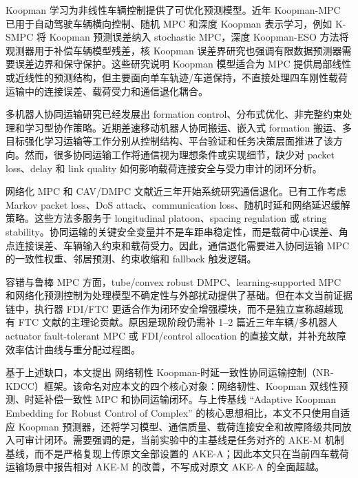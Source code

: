 \documentclass[twocolumn,3p,times,procedia]{elsarticle}
\newcommand{\AKE}{AKE-M}
\newcommand{\Method}{NR-KDCC}
\newcommand{\MethodCN}{网络韧性 Koopman-时延一致性协同运输控制}
\begin{document}
Koopman 学习为非线性车辆控制提供了可优化预测模型。近年 Koopman-MPC 已用于自动驾驶车辆横向控制、随机 MPC 和深度 Koopman 表示学习，例如 K-SMPC 将 Koopman 预测误差纳入 stochastic MPC，深度 Koopman-ESO 方法将观测器用于补偿车辆模型残差，核 Koopman 误差界研究也强调有限数据预测器需要误差边界和保守保护\cite{kim2025ksmpc,chen2024esoDeepKoopman,philipp2023koopmanErrorBounds,cibulka2021koopmanVehicleMpc}。这些研究说明 Koopman 模型适合为 MPC 提供局部线性或近线性的预测结构，但主要面向单车轨迹/车道保持，不直接处理四车刚性载荷运输中的连接误差、载荷受力和通信退化耦合。

多机器人协同运输研究已经发展出 formation control、分布式优化、非完整约束处理和学习型协作策略。近期差速移动机器人协同搬运、嵌入式 formation 搬运、多目标强化学习运输等工作分别从控制结构、平台验证和任务决策层面推进了该方向\cite{cooperativeTransport2024ras,embeddedFormationTransport2024cep,multiObjectiveTransport2024mechatronics,intelligentCollaborativeTransport2024}。然而，很多协同运输工作将通信视为理想条件或实现细节，缺少对 packet loss、delay 和 link quality 如何影响载荷连接安全与受力审计的闭环分析。

网络化 MPC 和 CAV/DMPC 文献近三年开始系统研究通信退化。已有工作考虑 Markov packet loss、DoS attack、communication loss、随机时延和网络延迟缓解策略\cite{bian2025markovPacketLossDMPC,dosDMPC2024isa,robustCommunicationLoss2025trb,bao2024robustUkfMpc,networkLatencyCav2024sensors,dai2024networkedPredictiveControl}。这些方法多服务于 longitudinal platoon、spacing regulation 或 string stability。协同运输的关键安全变量并不是车距串稳定性，而是载荷中心误差、角点连接误差、车辆输入约束和载荷受力。因此，通信退化需要进入协同运输 MPC 的一致性权重、邻居预测、约束收缩和 fallback 触发逻辑。

容错与鲁棒 MPC 方面，tube/convex robust DMPC、learning-supported MPC 和网络化预测控制为处理模型不确定性与外部扰动提供了基础\cite{convexRobustDMPC2025ejc,gasparino2023nnMpcUncertainty,dai2024networkedPredictiveControl}。但在本文当前证据链中，执行器 FDI/FTC 更适合作为闭环安全增强模块，而不是独立宣称超越现有 FTC 文献的主理论贡献。原因是现阶段仍需补 1--2 篇近三年车辆/多机器人 actuator fault-tolerant MPC 或 FDI/control allocation 的直接文献，并补充故障效率估计曲线与重分配过程图。

基于上述缺口，本文提出 \MethodCN{}（\Method{}）框架。该命名对应本文的四个核心对象：网络韧性、Koopman 双线性预测、时延补偿一致性 MPC 和协同运输闭环。与上传基线 ``Adaptive Koopman Embedding for Robust Control of Complex'' 的核心思想相比，本文不只使用自适应 Koopman 预测器，还将学习模型、通信质量、载荷连接安全和故障降级共同放入可审计闭环。需要强调的是，当前实验中的主基线是任务对齐的 \AKE{} 机制基线，而不是严格复现上传原文全部设置的 AKE-A；因此本文只在当前四车载荷运输场景中报告相对 \AKE{} 的改善，不写成对原文 AKE-A 的全面超越。
\end{document}
